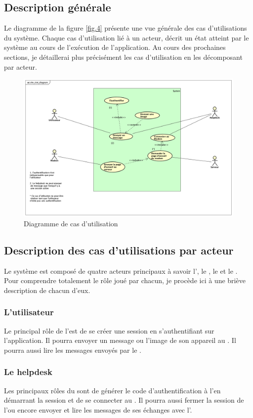 \subsection*{Description générale}
Le diagramme de la figure \ref{fig.4} présente une vue générale des cas d'utilisations du système. Chaque cas d'utilisation lié à un acteur, décrit un état atteint par le système au cours de l'exécution de l'application. Au cours des prochaines sections, je détaillerai plus précisément les cas d'utilisation en les décomposant par acteur.
\begin{figure}[H]
	\centering
	\includegraphics[scale=0.4]{assets/images/shv_use_case.png}
	\caption{Diagramme de cas d'utilisation}
	\label{fig.5}
\end{figure}

\subsection{Description des cas d'utilisations par acteur}
Le système est composé de quatre acteurs principaux à savoir l'\ut, le \hd, le \md et le \sv. Pour comprendre totalement le rôle joué par chacun, je procède ici à une briève description de chacun d'eux.
\subsubsection*{L'utilisateur}
Le principal rôle de l'\ut est de se créer une session en s'authentifiant sur l'application. Il pourra envoyer un message ou l'image de son appareil au \hd. Il pourra aussi lire les messages envoyés par le \hd.

\subsubsection*{Le helpdesk}
Les principaux rôles du \hd sont de générer le code d'authentification à l'\ut en démarrant la session et de se connecter au \md. Il pourra aussi fermer la session de l'\ut ou encore envoyer et lire les messages de ses échanges avec l'\ut.


